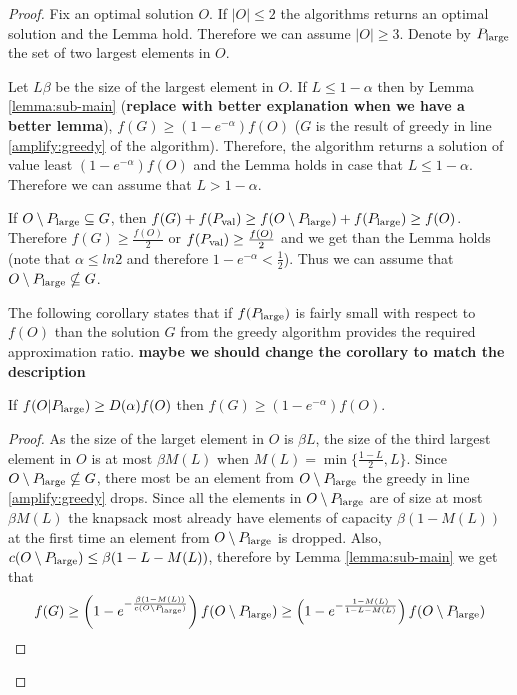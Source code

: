 \begin{proof}

	Fix an optimal solution $O$.
	 If $|O|\leq 2$ the algorithms returns an optimal solution and the Lemma hold.
	Therefore we can assume $|O| \geq 3$.  Denote by $P_{\text{large}}$ the set of  two largest elements in $O$.
	
	Let $L\beta$ be the size of the largest element in $O$.  If $L\leq 1-\alpha$ then
	by Lemma \ref{lemma:sub-main} ({\bf replace with better explanation when we have a better lemma}), $f(G) \geq (1-e^{-\alpha}) f(O)$  ($G$ is the result of 
	greedy  in line \ref{amplify:greedy} of the algorithm). Therefore, the algorithm
	returns a solution of value least $(1-e^{-\alpha})f(O)$ and the Lemma holds 
	in case that $L\leq 1-\alpha$. Therefore we can assume that $L> 1-\alpha$.
	
	If $O\setminus P_{\text{large}} \subseteq G$, then
	$f(G)+ f(P_{\text{val}})\geq f(O\setminus P_{\text{large}}) + f(P_{\text{large}}) \geq f(O)$.
	Therefore $f(G)\geq \frac{f(O)}{2}$ or $f(P_{\text{val}})\geq \frac{f(O)}{2}$ 
	and we get than the Lemma holds (note that $\alpha \leq ln 2$ and therefore
	$1-e^{-\alpha} < \frac{1}{2}$). Thus we can assume that 
	$O\setminus P_{\text{large}} \nsubseteq G$.
	
	The following corollary states that if $f(P_{\text{large}})$ is fairly small
	with respect to $f(O)$ than the solution $G$ from the greedy algorithm provides
	the required approximation ratio. {\bf maybe we should change the corollary to match the description}
	
	\begin{corollary}
		\label{corollary:cor1}
	If $f(O|P_{\text{large}}) \geq D(\alpha) f(O)$ then $f(G)\geq (1-e^{-\alpha})f(O)$.
	\end{corollary}

\begin{proof}
	
	As the size of the larget element in $O$ is $\beta L$, the size of the third 
	largest 
	element in $O$ is at most $\beta M(L)$ when $M(L)= \min \{\frac{1-L}{2}, L\}$. Since 
	$O\setminus P_{\text{large}} \nsubseteq G$, there most be an element from $O \setminus P_{\text{large}}$ the greedy in line \ref{amplify:greedy} drops. Since all the elements 
	in $O\setminus P_{\text{large}}$ are of size at most $\beta M(L)$ the knapsack most 
	already have elements of capacity $\beta (1-M(L))$ at the first time an element from $O\setminus P_{\text{large}}$ is dropped. Also, $c(O\setminus P_{\text{large}}) \leq \beta(1-L -M(L))$, therefore by Lemma \ref{lemma:sub-main} we get that 
  	$$f(G)\geq \left(1-e^{- \frac{\beta (1-M(L)) }{c(O\setminus P_{\text{large}})}}\right) f(O\setminus P_{\text{large}})
  			\geq \left(1-e^{- \frac{1-M(L) }{1-L-M(L)}}\right) f(O\setminus P_{\text{large}}) $$
  			

\end{proof}
\end{proof}
